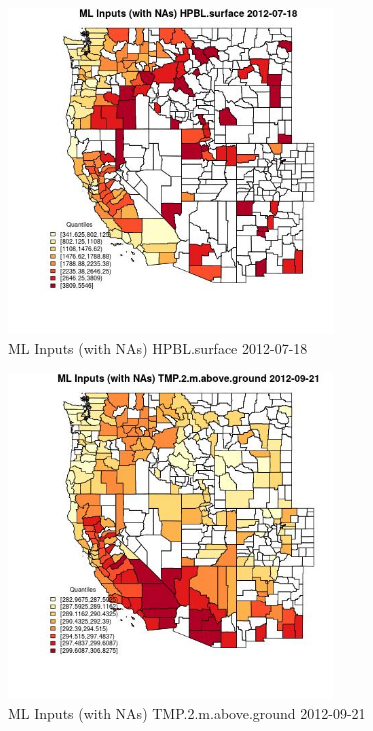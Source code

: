 \begin{figure} 
\centering  
\includegraphics[width=0.77\textwidth]{Code_Outputs/Report_ML_input_PM25_Step4_part_e_de_duplicated_aves_compiled_2019-05-14wNAs_CountyHPBLsurfaceMean2012-07-18_2012-07-18.jpg} 
\caption{\label{fig:Report_ML_input_PM25_Step4_part_e_de_duplicated_aves_compiled_2019-05-14wNAsCountyHPBLsurfaceMean2012-07-18_2012-07-18}ML Inputs (with NAs) HPBL.surface 2012-07-18} 
\end{figure} 
 

\begin{figure} 
\centering  
\includegraphics[width=0.77\textwidth]{Code_Outputs/Report_ML_input_PM25_Step4_part_e_de_duplicated_aves_compiled_2019-05-14wNAs_CountyTMP2mabovegroundMean2012-09-21_2012-09-21.jpg} 
\caption{\label{fig:Report_ML_input_PM25_Step4_part_e_de_duplicated_aves_compiled_2019-05-14wNAsCountyTMP2mabovegroundMean2012-09-21_2012-09-21}ML Inputs (with NAs) TMP.2.m.above.ground 2012-09-21} 
\end{figure} 
 

